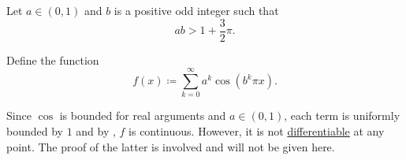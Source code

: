 \begin{example}\label{ex:weierstrass_nowhere_differentiable_function}\mcite\cite[]{Фихтенгольц1968Том2}
  Let \( a \in (0, 1) \) and \( b \) is a positive odd integer such that
  \begin{equation*}
    ab > 1 + \frac 3 2 \pi.
  \end{equation*}

  Define the function
  \begin{equation*}
    f(x) \coloneqq \sum_{k=0}^\infty a^k \cos(b^k \pi x).
  \end{equation*}

  \begin{figure}
    \centering
    \iffalse\begin{mplibcode}
      input metapost/plotting;
      u := 3cm;

      a := 0.9;
      b := 7;
      n := 4;

      vardef f_k(expr x, k) =
      pow(a, k) * cosd(pow(b, k) * pi * x)
      enddef;

      vardef f(expr x) =
      result := 0;

      for k = 1 upto n:
      result := result + f_k(x, k);
      endfor

      result / 2 %
      enddef;

      beginfig(2)
      drawarrow (-pi / 2, 0) scaled u -- (pi / 2, 0) scaled u;
      drawarrow (0, -pi / 10) scaled u -- (0, pi / 2) scaled u;

      draw path_of_plot(f, -pi / 2, pi / 2, 0.01, u);
      endfig;
    \end{mplibcode}\fi
  \end{figure}

  Since \( \cos \) is bounded for real arguments and \( a \in (0, 1) \), each term is uniformly bounded by \( 1 \) and by , \( f \) is continuous. However, it is not \hyperref[def:differentiability]{differentiable} at any point. The proof of the latter is involved and will not be given here.
\end{example}
